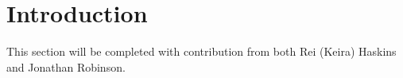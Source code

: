 \section{Introduction}
This section will be completed with contribution from both Rei (Keira) Haskins and Jonathan Robinson.

%


